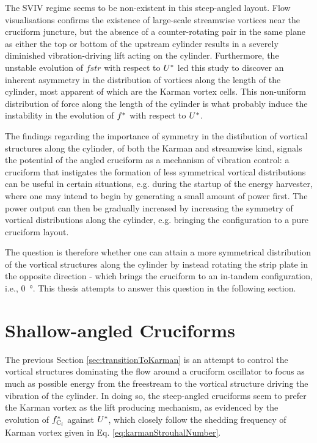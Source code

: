 \documentclass[oneside]{utmthesis}
\begin{document}
The SVIV regime seems to be non-existent in this steep-angled layout. Flow visualisations confirms the existence of large-scale streamwise vortices near the cruciform juncture, but the absence of a counter-rotating pair in the same plane as either the top or bottom of the upstream cylinder results in a severely diminished vibration-driving lift acting on the cylinder. Furthermore, the unstable evolution of $fstr$ with respect to $U^{*}$ led this study to discover an inherent asymmetry in the distribution of vortices along the length of the cylinder, most apparent of which are the Karman vortex cells. This non-uniform distribution of force along the length of the cylinder is what probably induce the instability in the evolution of $f^{*}$ with respect to $U^{*}$. 

The findings regarding the importance of symmetry in the distibution of vortical structures along the cylinder, of both the Karman and streamwise kind, signals the potential of the angled cruciform as a mechanism of vibration control: a cruciform that instigates the formation of less symmetrical vortical distributions can be useful in certain situations, e.g. during the startup of the energy harvester, where one may intend to begin by generating a small amount of power first. The power output can then be gradually increased by increasing the symmetry of vortical distributions along the cylinder, e.g. bringing the configuration to a pure cruciform layout.

The question is therefore whether one can attain a more symmetrical distribution of the vortical structures along the cylinder by instead rotating the strip plate in the opposite direction - which brings the cruciform to an in-tandem configuration, i.e., \SI{0}{\degree}. This thesis attempts to answer this question in the following section.

\section{Shallow-angled Cruciforms}\label{sec:kvivRegime}
The previous Section \ref{sec:transitionToKarman} is an attempt to control the vortical structures dominating the flow around a cruciform oscillator to focus as much as possible energy from the freestream to the vortical structure driving the vibration of the cylinder. In doing so, the steep-angled cruciforms seem to prefer the Karman vortex as the lift producing mechanism, as evidenced by the evolution of $f_{\text{C}_{l}}^{*}$ against $U^{*}$, which closely follow the shedding frequency of Karman vortex given in Eq. \ref{eq:karmanStrouhalNumber}.
\end{document}
